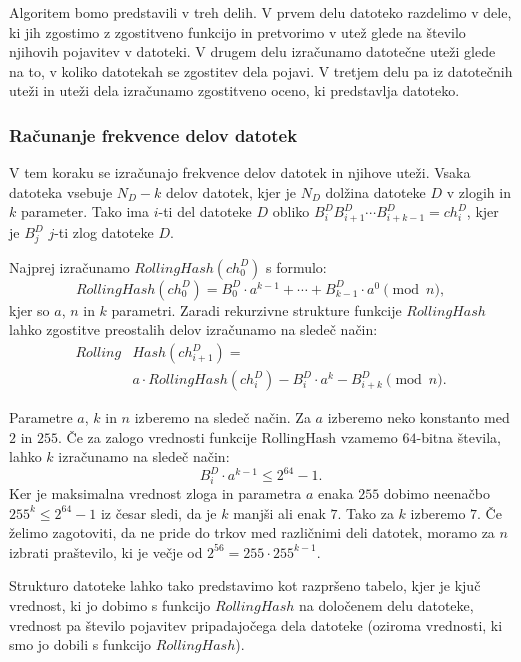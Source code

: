 \documentclass{acm_proc_article-sp}
\begin{document}
Algoritem bomo predstavili v treh delih. V prvem delu datoteko razdelimo v dele, ki jih zgostimo z zgostitveno funkcijo in pretvorimo v utež glede na število njihovih pojavitev v datoteki. V drugem delu izračunamo datotečne uteži glede na to, v koliko datotekah se zgostitev dela pojavi. V tretjem delu pa iz datotečnih uteži in uteži dela izračunamo zgostitveno oceno, ki predstavlja datoteko.

\subsubsection{Računanje frekvence delov datotek}

V tem koraku se izračunajo frekvence delov datotek in njihove uteži. Vsaka datoteka vsebuje $N_D - k$ delov datotek, kjer je $N_D$ dolžina datoteke $D$ v zlogih in $k$ parameter. Tako ima $i$-ti del datoteke $D$ obliko $B_{i}^{D}B_{i+1}^{D} \cdots B_{i+k-1}^{D} = ch_{i}^D$, kjer je $B_{j}^{D}$ $j$-ti zlog datoteke $D$.

Najprej izračunamo $RollingHash(ch_{0}^D)$ s formulo: 
\[RollingHash(ch_{0}^D) = B_{0}^{D} \cdot a^{k-1} + \cdots + B_{k-1}^{D} \cdot a^0 \pmod n,\]
kjer so $a$, $n$ in $k$ parametri. Zaradi rekurzivne strukture funkcije $RollingHash$ lahko zgostitve preostalih delov izračunamo na sledeč način:
\begin{align*}
Rolling&Hash(ch_{i+1}^D) = \\
&a \cdot RollingHash(ch_{i}^D)-B_{i}^{D} \cdot a^{k}-B_{i+k}^D \pmod n.
\end{align*}

Parametre $a$, $k$ in $n$ izberemo na sledeč način. Za $a$ izberemo neko konstanto med $2$ in $255$. Če za zalogo vrednosti funkcije RollingHash vzamemo $64$-bitna števila, lahko $k$ izračunamo na sledeč način: \begin{displaymath}  B_{i}^{D} \cdot a^{k-1} \leq 2^{64}-1.\end{displaymath} Ker je maksimalna vrednost zloga in parametra $a$ enaka $255$ dobimo neenačbo $255^k \leq 2^{64}-1$ iz česar sledi, da je $k$ manjši ali enak $7$. Tako za $k$ izberemo $7$. Če želimo zagotoviti, da ne pride do trkov med različnimi deli datotek, moramo za $n$ izbrati praštevilo, ki je večje od $2^{56}=255\cdot 255^{k-1}$. 

Strukturo datoteke lahko tako predstavimo kot razpršeno tabelo, kjer je kjuč vrednost, ki jo dobimo s funkcijo $RollingHash$ na določenem delu datoteke, vrednost pa število pojavitev pripadajočega dela datoteke (oziroma vrednosti, ki smo jo dobili s funkcijo $RollingHash$).
\end{document}
